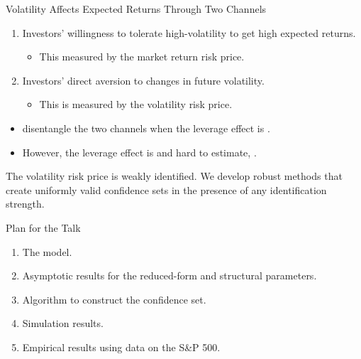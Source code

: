 \documentclass[smaller, aspectratio=169]{beamer}
\let\emph\relax
\begin{document}
\begin{frame}[c]{Volatility Affects Expected Returns Through Two Channels}

  \begin{enumerate}
    \item Investors' willingness to tolerate high-volatility to get high expected returns.
      \begin{itemize}
        \item This measured by the market return risk price.
      \end{itemize}
%
        \item Investors' direct aversion to changes in future volatility.
      \begin{itemize}
        \item This is measured by the volatility risk price.
      \end{itemize}
  \end{enumerate}
      \pause

%
  \begin{itemize}
    \item \Textcite{han2018leverage} disentangle the two channels when the leverage effect is \emph{large}. 
      \pause
    \item However, the leverage effect is \emph{small} and hard to estimate, \parencites{aitsahalia2013leverage, bandi2012timevarying}.
  \end{itemize}

  \pause
  \bigskip

  \begin{block}{}
    The volatility risk price is weakly identified. We develop robust methods that create uniformly valid confidence sets in the presence of any identification strength.
  \end{block}
  
\end{frame}


\begin{frame}[c]{Plan for the Talk}
  \begin{enumerate}
%
    \item The model.
      \bigskip
%
    \item Asymptotic results for the reduced-form and structural parameters.
      \bigskip
%
    \item Algorithm to construct the confidence set.
      \bigskip
%
    \item Simulation results. 
      \bigskip
%
    \item Empirical results using data on the S\&P 500.
%
  \end{enumerate}
\end{frame}
\end{document}
